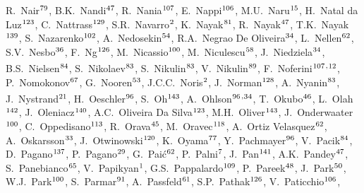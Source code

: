 \begin{flushleft}
R.~Nair$^\textrm{\scriptsize 79}$,
B.K.~Nandi$^\textrm{\scriptsize 47}$,
R.~Nania$^\textrm{\scriptsize 107}$,
E.~Nappi$^\textrm{\scriptsize 106}$,
M.U.~Naru$^\textrm{\scriptsize 15}$,
H.~Natal da Luz$^\textrm{\scriptsize 123}$,
C.~Nattrass$^\textrm{\scriptsize 129}$,
S.R.~Navarro$^\textrm{\scriptsize 2}$,
K.~Nayak$^\textrm{\scriptsize 81}$,
R.~Nayak$^\textrm{\scriptsize 47}$,
T.K.~Nayak$^\textrm{\scriptsize 139}$,
S.~Nazarenko$^\textrm{\scriptsize 102}$,
A.~Nedosekin$^\textrm{\scriptsize 54}$,
R.A.~Negrao De Oliveira$^\textrm{\scriptsize 34}$,
L.~Nellen$^\textrm{\scriptsize 62}$,
S.V.~Nesbo$^\textrm{\scriptsize 36}$,
F.~Ng$^\textrm{\scriptsize 126}$,
M.~Nicassio$^\textrm{\scriptsize 100}$,
M.~Niculescu$^\textrm{\scriptsize 58}$,
J.~Niedziela$^\textrm{\scriptsize 34}$,
B.S.~Nielsen$^\textrm{\scriptsize 84}$,
S.~Nikolaev$^\textrm{\scriptsize 83}$,
S.~Nikulin$^\textrm{\scriptsize 83}$,
V.~Nikulin$^\textrm{\scriptsize 89}$,
F.~Noferini$^\textrm{\scriptsize 107}$\textsuperscript{,}$^\textrm{\scriptsize 12}$,
P.~Nomokonov$^\textrm{\scriptsize 67}$,
G.~Nooren$^\textrm{\scriptsize 53}$,
J.C.C.~Noris$^\textrm{\scriptsize 2}$,
J.~Norman$^\textrm{\scriptsize 128}$,
A.~Nyanin$^\textrm{\scriptsize 83}$,
J.~Nystrand$^\textrm{\scriptsize 21}$,
H.~Oeschler$^\textrm{\scriptsize 96}$,
S.~Oh$^\textrm{\scriptsize 143}$,
A.~Ohlson$^\textrm{\scriptsize 96}$\textsuperscript{,}$^\textrm{\scriptsize 34}$,
T.~Okubo$^\textrm{\scriptsize 46}$,
L.~Olah$^\textrm{\scriptsize 142}$,
J.~Oleniacz$^\textrm{\scriptsize 140}$,
A.C.~Oliveira Da Silva$^\textrm{\scriptsize 123}$,
M.H.~Oliver$^\textrm{\scriptsize 143}$,
J.~Onderwaater$^\textrm{\scriptsize 100}$,
C.~Oppedisano$^\textrm{\scriptsize 113}$,
R.~Orava$^\textrm{\scriptsize 45}$,
M.~Oravec$^\textrm{\scriptsize 118}$,
A.~Ortiz Velasquez$^\textrm{\scriptsize 62}$,
A.~Oskarsson$^\textrm{\scriptsize 33}$,
J.~Otwinowski$^\textrm{\scriptsize 120}$,
K.~Oyama$^\textrm{\scriptsize 77}$,
Y.~Pachmayer$^\textrm{\scriptsize 96}$,
V.~Pacik$^\textrm{\scriptsize 84}$,
D.~Pagano$^\textrm{\scriptsize 137}$,
P.~Pagano$^\textrm{\scriptsize 29}$,
G.~Pai\'{c}$^\textrm{\scriptsize 62}$,
P.~Palni$^\textrm{\scriptsize 7}$,
J.~Pan$^\textrm{\scriptsize 141}$,
A.K.~Pandey$^\textrm{\scriptsize 47}$,
S.~Panebianco$^\textrm{\scriptsize 65}$,
V.~Papikyan$^\textrm{\scriptsize 1}$,
G.S.~Pappalardo$^\textrm{\scriptsize 109}$,
P.~Pareek$^\textrm{\scriptsize 48}$,
J.~Park$^\textrm{\scriptsize 50}$,
W.J.~Park$^\textrm{\scriptsize 100}$,
S.~Parmar$^\textrm{\scriptsize 91}$,
A.~Passfeld$^\textrm{\scriptsize 61}$,
S.P.~Pathak$^\textrm{\scriptsize 126}$,
V.~Paticchio$^\textrm{\scriptsize 106}$,

\end{flushleft}
